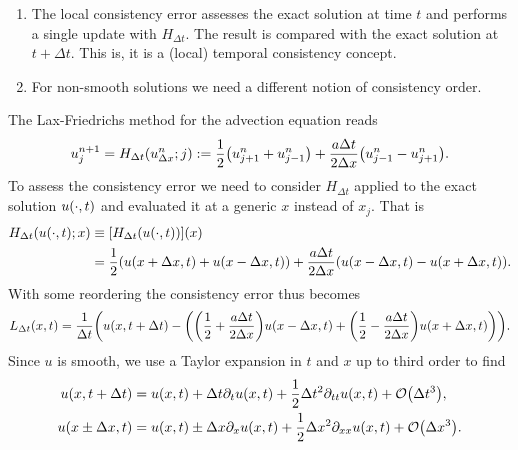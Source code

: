 \begin{remark}
	\begin{enumerate}
		\item The local consistency error assesses the exact solution at time \(t\) and performs a single update with \(H_{\Delta t}\).
		The result is compared with the exact solution at \(t + \Delta t\).
		This is, it is a (local) temporal consistency concept.
		\item For non-smooth solutions we need a different notion of consistency order.
	\end{enumerate}
\end{remark}

\begin{example}
	The Lax-Friedrichs method for the advection equation reads
	\[
		u_j^{n + 1} = H_{\Delta t}\parentheses*{u_{\Delta x}^n; j} := \frac{1}{2}\parentheses*{u_{j + 1}^n + u_{j - 1}^n} + \frac{a\Delta t}{2\Delta x}\parentheses*{u_{j - 1}^n - u_{j + 1}^n}.
	\]
	To assess the consistency error we need to consider \(H_{\Delta t}\) applied to the exact solution \(u\parentheses*{\cdot, t}\) and evaluated it at a generic \(x\) instead of \(x_j\).
	That is
	\begin{align*}
		H_{\Delta t}\parentheses*{u\parentheses*{\cdot, t}; x} &\equiv \brackets*{H_{\Delta t}\parentheses*{u\parentheses*{\cdot, t}}}\parentheses*{x}\\
		&= \frac{1}{2}\parentheses*{u\parentheses*{x + \Delta x, t} + u\parentheses*{x - \Delta x, t}} + \frac{a\Delta t}{2\Delta x}\parentheses*{u\parentheses*{x - \Delta x, t} - u\parentheses*{x + \Delta x, t}}.
	\end{align*}
	With some reordering the consistency error thus becomes
	\[
		L_{\Delta t}\parentheses*{x, t} = \frac{1}{\Delta t}\parentheses*{u\parentheses*{x, t + \Delta t} - \parentheses*{\parentheses*{\frac{1}{2} + \frac{a\Delta t}{2\Delta x}}u\parentheses*{x - \Delta x, t} + \parentheses*{\frac{1}{2} - \frac{a\Delta t}{2\Delta x}}u\parentheses*{x + \Delta x, t}}}.
	\]
	Since \(u\) is smooth, we use a Taylor expansion in \(t\) and \(x\) up to third order to find
	\begin{align*}
		u\parentheses*{x, t + \Delta t} &= u\parentheses*{x, t} + \Delta t\partial_t u\parentheses*{x, t} + \frac{1}{2}\Delta t^2 \partial_{tt}u\parentheses*{x, t} + \mathcal{O}\parentheses*{\Delta t^3},\\
		u\parentheses*{x \pm \Delta x, t} &= u\parentheses*{x, t} \pm \Delta x\partial_x u\parentheses*{x, t} + \frac{1}{2}\Delta x^2 \partial_{xx}u\parentheses*{x, t} + \mathcal{O}\parentheses*{\Delta x^3}.

\end{align*}
\end{example}
